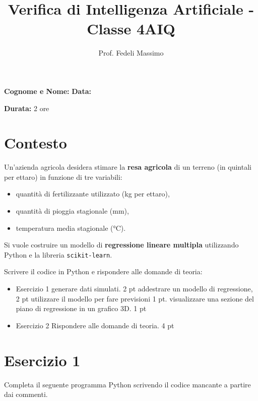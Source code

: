 \documentclass[a4paper,12pt]{article}
\title{Verifica di Intelligenza Artificiale - Classe 4AIQ}
\author{Prof. Fedeli Massimo}
\date{}
\begin{document}
	
	\maketitle
	
	\textbf{Cognome e Nome:} \underline{\hspace{8cm}} \hfill
	\textbf{Data:} \underline{\hspace{3cm}}
	
	\vspace{0.5cm}
	
	\textbf{Durata:} 2 ore
	
	\vspace{0.5cm}
	
	\section*{Contesto}
	
	Un'azienda agricola desidera stimare la \textbf{resa agricola} di un terreno (in quintali per ettaro) in funzione di tre variabili:
	
	\begin{itemize}
		\item quantità di fertilizzante utilizzato (kg per ettaro),
		\item quantità di pioggia stagionale (mm),
		\item temperatura media stagionale (°C).
	\end{itemize}
	
	Si vuole costruire un modello di \textbf{regressione lineare multipla} utilizzando Python e la libreria \texttt{scikit-learn}.
	
Scrivere il codice in Python e rispondere alle domande di teoria:
	
	\begin{itemize}
		\item Esercizio 1
		\subitem generare dati simulati. 2 pt
		\subitem addestrare un modello di regressione, 2 pt
		\subitem utilizzare il modello per fare previsioni  1 pt.
		\subitem visualizzare una sezione del piano di regressione in un grafico 3D. 1 pt
		\item Esercizio 2
		\subitem Rispondere alle domande di teoria. 4 pt
	\end{itemize}
	
	\section*{Esercizio 1}
	
	Completa il seguente programma Python scrivendo il codice mancante a partire dai commenti.
	
\end{document}
